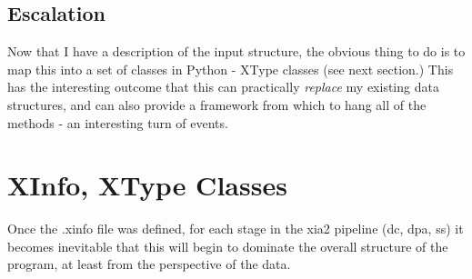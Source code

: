 \documentclass[a4paper, 11pt]{article}
\begin{document}
\subsection{Escalation}

Now that I have a description of the input structure, the obvious thing
to do is to map this into a set of classes in Python - XType classes
(see next section.) This has the interesting outcome that this can practically
\emph{replace} my existing data structures, and can also provide a 
framework from which to hang all of the methods - an interesting turn of
events.

\section{XInfo, XType Classes}

Once the .xinfo file was defined, for each stage in the xia2 pipeline
(dc, dpa, ss) it becomes inevitable that this will begin to dominate the
overall structure of the program, at least from the perspective of the 
data. 
\end{document}
